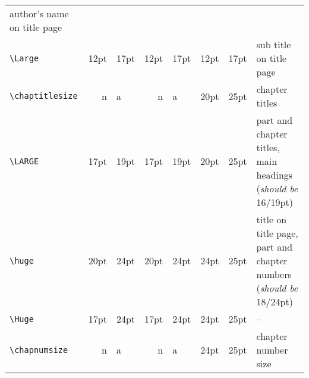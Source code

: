 \documentclass[cup6a]{cupbook}
\begin{document}
\begin{table*}[hbt]
\begin{tabular}{l|r@{/}lr@{/}lr@{/}lp{4cm}}
                   author's name on title page\\
 \verb"\Large"        & 12pt & 17pt & 12pt & 17pt & 12pt & 17pt & sub title
                   on title page\\
 \verb"\chaptitlesize"
                      &  n   &  a   &  n   & a    & 20pt & 25pt &
                   chapter titles\\
 \verb"\LARGE"        & 17pt & 19pt & 17pt & 19pt & 20pt & 25pt & part and
                   chapter titles, main headings (\emph{should be} 16/19pt)\\
 \verb"\huge"         & 20pt & 24pt & 20pt & 24pt & 24pt & 25pt & title on
                   title page, part and chapter numbers (\emph{should be}
                   18/24pt)\\
 \verb"\Huge"         & 17pt & 24pt & 17pt & 24pt & 24pt & 25pt & -- \\
 \verb"\chapnumsize"
                      &  n   &  a   &  n   & a    & 24pt & 25pt &
                   chapter number size\\
 \hline\hline
 \end{tabular}
\end{table*}
\end{document}
